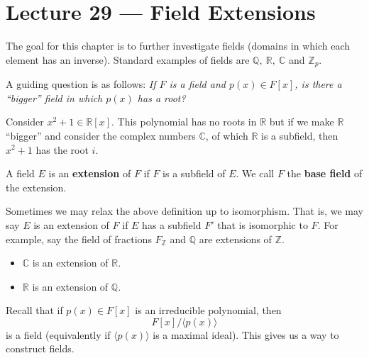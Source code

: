 \section{Lecture 29 — Field Extensions}

The goal for this chapter is to further investigate fields (domains in which each element has an inverse). Standard examples of fields are $\mathbb Q,~\mathbb R,~\mathbb C$ and $\mathbb Z_p$.

A guiding question is as follows: \textit{If $F$ is a field and $p(x)\in F[x]$, is there a ``bigger'' field in which $p(x)$ has a root?}

\begin{example}
	Consider $x^2+1\in\mathbb R[x]$. This polynomial has no roots in $\mathbb R$ but if we make $\mathbb R$ ``bigger'' and consider the complex numbers $\mathbb C$, of which $\mathbb R$ is a subfield, then $x^2+1$ has the root $i$.
\end{example}

\begin{definition}
	A field $E$ is an \textbf{extension} of $F$ if $F$ is a subfield of $E$. We call $F$ the \textbf{base field} of the extension.
\end{definition}

\begin{remark}
	Sometimes we may relax the above definition up to isomorphism. That is, we may say $E$ is an extension of $F$ if $E$ has a subfield $F'$ that is isomorphic to $F$. For example, say the field of fractions $F_{\mathbb Z}$ and $\mathbb Q$ are extensions of $\mathbb Z$.
\end{remark}

\begin{example}\phantom{x}
	\begin{itemize}
		\item $\mathbb C$ is an extension of $\mathbb R$.
		\item $\mathbb R$ is an extension of $\mathbb Q$.
	\end{itemize}
\end{example}

Recall that if $p(x)\in F[x]$ is an irreducible polynomial, then
$$F[x]/\langle p(x)\rangle$$
is a field (equivalently if $\langle p(x)\rangle$ is a maximal ideal). This gives us a way to construct fields.

